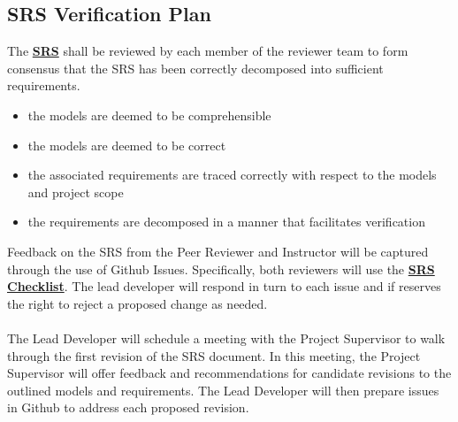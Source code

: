 \documentclass[12pt, titlepage]{article}
\begin{document}
\subsection{SRS Verification Plan}
The \textbf{\href{https://github.com/KiranSingh15/CAS-741-Image-Correspondences/blob/main/docs/SRS/SRS.pdf}
{SRS}} shall be reviewed by each member of the reviewer team to form consensus that the SRS has been correctly 
decomposed into sufficient requirements.\\
\begin{itemize}
\item the models are deemed to be comprehensible
\item the models are deemed to be correct
\item the associated requirements are traced correctly with respect to the models 
and project scope 
\item the requirements are decomposed in a manner that facilitates verification
\end{itemize}
Feedback on the SRS from the Peer Reviewer and Instructor will be captured through 
the use of Github Issues. Specifically, both reviewers will use the 
\textbf{\href{https://github.com/KiranSingh15/CAS-741-Image-Correspondences/blob/
main/docs/Checklists/SRS-Checklist.pdf}
{SRS Checklist}}. 
The lead developer will respond in turn to each issue and if 
reserves the right to reject a proposed change as needed. \\ \\
The Lead Developer will schedule a meeting with the Project Supervisor to walk through 
the first revision of the SRS document. In this meeting, the Project Supervisor will offer 
feedback and recommendations for candidate revisions to the outlined models and requirements. 
The Lead Developer will then prepare issues in Github to address each proposed revision. \\ \\
\end{document}
